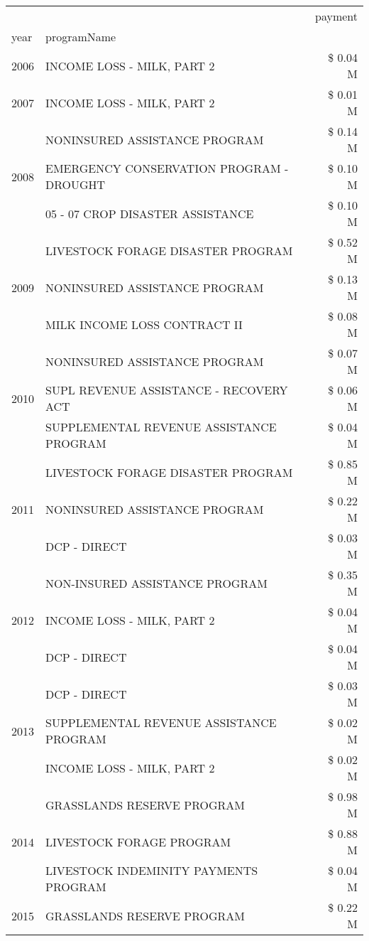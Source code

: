 \begin{tabular}{llr}
\toprule
 &  & payment \\
year & programName &  \\
\midrule
2006 & INCOME LOSS - MILK, PART 2 & \$ 0.04 M \\
\cline{1-3}
2007 & INCOME LOSS - MILK, PART 2 & \$ 0.01 M \\
\cline{1-3}
\multirow[t]{3}{*}{2008} & NONINSURED ASSISTANCE PROGRAM & \$ 0.14 M \\
 & EMERGENCY CONSERVATION PROGRAM - DROUGHT & \$ 0.10 M \\
 & 05 - 07 CROP DISASTER ASSISTANCE & \$ 0.10 M \\
\cline{1-3}
\multirow[t]{3}{*}{2009} & LIVESTOCK FORAGE DISASTER  PROGRAM & \$ 0.52 M \\
 & NONINSURED ASSISTANCE PROGRAM & \$ 0.13 M \\
 & MILK INCOME LOSS CONTRACT II & \$ 0.08 M \\
\cline{1-3}
\multirow[t]{3}{*}{2010} & NONINSURED ASSISTANCE PROGRAM & \$ 0.07 M \\
 & SUPL REVENUE ASSISTANCE - RECOVERY ACT & \$ 0.06 M \\
 & SUPPLEMENTAL REVENUE ASSISTANCE PROGRAM & \$ 0.04 M \\
\cline{1-3}
\multirow[t]{3}{*}{2011} & LIVESTOCK FORAGE DISASTER PROGRAM & \$ 0.85 M \\
 & NONINSURED ASSISTANCE PROGRAM & \$ 0.22 M \\
 & DCP - DIRECT & \$ 0.03 M \\
\cline{1-3}
\multirow[t]{3}{*}{2012} & NON-INSURED ASSISTANCE PROGRAM & \$ 0.35 M \\
 & INCOME LOSS - MILK, PART 2 & \$ 0.04 M \\
 & DCP - DIRECT & \$ 0.04 M \\
\cline{1-3}
\multirow[t]{3}{*}{2013} & DCP - DIRECT & \$ 0.03 M \\
 & SUPPLEMENTAL REVENUE ASSISTANCE PROGRAM & \$ 0.02 M \\
 & INCOME LOSS - MILK, PART 2 & \$ 0.02 M \\
\cline{1-3}
\multirow[t]{3}{*}{2014} & GRASSLANDS RESERVE PROGRAM & \$ 0.98 M \\
 & LIVESTOCK FORAGE PROGRAM & \$ 0.88 M \\
 & LIVESTOCK INDEMINITY PAYMENTS PROGRAM & \$ 0.04 M \\
\cline{1-3}
\multirow[t]{3}{*}{2015} & GRASSLANDS RESERVE PROGRAM & \$ 0.22 M \\

\end{tabular}
